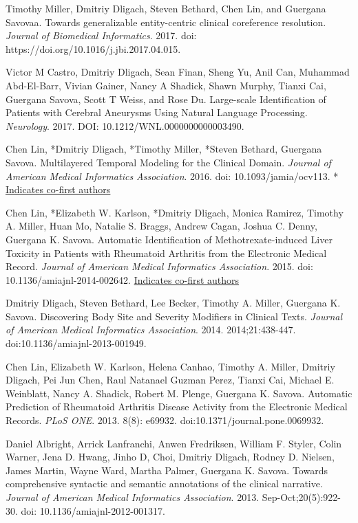 \documentclass[letterpaper]{article}
\renewenvironment{itemize}{
  \begin{list}{}{
    \setlength{\leftmargin}{1.5em}
  }
}{
  \end{list}
}
\begin{document}
\begin{itemize}
\item Timothy Miller, Dmitriy Dligach, Steven Bethard, Chen Lin, and Guergana Savovaa. Towards generalizable entity-centric clinical coreference resolution. \emph{Journal of Biomedical Informatics}. 2017. doi: https://doi.org/10.1016/j.jbi.2017.04.015.
\item Victor M Castro, Dmitriy Dligach, Sean Finan, Sheng Yu, Anil Can, Muhammad Abd-El-Barr, Vivian Gainer, Nancy A Shadick, Shawn Murphy, Tianxi Cai, Guergana Savova, Scott T Weiss, and Rose Du. Large-scale Identification of Patients with Cerebral Aneurysms Using Natural Language Processing. \emph{Neurology}. 2017. DOI: 10.1212/WNL.0000000000003490.
\item *Chen Lin, *Dmitriy Dligach, *Timothy Miller, *Steven Bethard, Guergana Savova. Multilayered Temporal Modeling for the Clinical Domain. \emph{Journal of American Medical Informatics Association}. 2016. doi: 10.1093/jamia/ocv113. * \underline{Indicates co-first authors}
\item *Chen Lin, *Elizabeth W. Karlson, *Dmitriy Dligach, Monica Ramirez, Timothy A. Miller, Huan Mo, Natalie S. Braggs, Andrew Cagan, Joshua C. Denny, Guergana K. Savova. Automatic Identification of Methotrexate-induced Liver Toxicity in Patients with Rheumatoid Arthritis from the Electronic Medical Record. \emph{Journal of American Medical Informatics Association}. 2015. doi: 10.1136/amiajnl-2014-002642. \newline * \underline{Indicates co-first authors}
\item Dmitriy Dligach, Steven Bethard, Lee Becker, Timothy A. Miller, Guergana K. Savova. Discovering Body Site and Severity Modifiers in Clinical Texts. \emph{Journal of American Medical Informatics Association}. 2014. 2014;21:438-447. doi:10.1136/amiajnl-2013-001949.
\item Chen Lin, Elizabeth W. Karlson, Helena Canhao, Timothy A. Miller, Dmitriy Dligach, Pei Jun Chen, Raul Natanael Guzman Perez, Tianxi Cai, Michael E. Weinblatt, Nancy A. Shadick, Robert M. Plenge, Guergana K. Savova. Automatic Prediction of Rheumatoid Arthritis Disease Activity from the Electronic Medical Records. \emph{PLoS ONE}. 2013. 8(8): e69932. doi:10.1371/journal.pone.0069932.
\item Daniel Albright, Arrick Lanfranchi, Anwen Fredriksen, William F. Styler, Colin Warner, Jena D. Hwang, Jinho D, Choi, Dmitriy Dligach, Rodney D. Nielsen, James Martin, Wayne Ward, Martha Palmer, Guergana K. Savova. Towards comprehensive syntactic and semantic annotations of the clinical narrative. \emph{Journal of American Medical Informatics Association}. 2013. Sep-Oct;20(5):922-30. doi: 10.1136/amiajnl-2012-001317.

\end{itemize}
\end{document}
